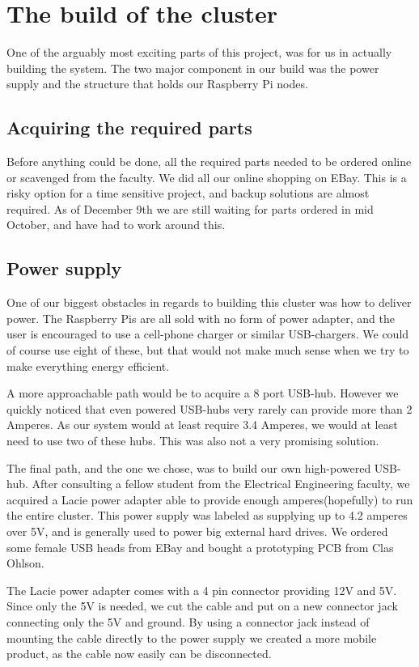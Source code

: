 \clearpage
\section{The build of the cluster}
\label{sec:build}
One of the arguably most exciting parts of this project, was for us in actually building the system. The two major component in our build was the power supply and the structure that holds our Raspberry Pi nodes. 

\subsection{Acquiring the required parts}
Before anything could be done, all the required parts needed to be ordered online or scavenged from the faculty. We did all our online shopping on EBay. This is a risky option for a time sensitive project, and backup solutions are almost required. As of December 9th we are still waiting for parts ordered in mid October, and have had to work around this.   

\subsection{Power supply}
One of our biggest obstacles in regards to building this cluster was how to deliver power. The Raspberry Pis are all sold with no form of power adapter, and the user is encouraged to use a cell-phone charger or similar USB-chargers. We could of course use eight of these, but that would not make much sense when we try to make everything energy efficient. 

A more approachable path would be to acquire a 8 port USB-hub. However we quickly noticed that even powered USB-hubs very rarely can provide more than 2 Amperes. As our system would at least require 3.4 Amperes, we would at least need to use two of these hubs. This was also not a very promising solution.

The final path, and the one we chose, was to build our own high-powered USB-hub. After consulting a fellow student from the Electrical Engineering faculty, we acquired a Lacie power adapter able to provide enough amperes(hopefully) to run the entire cluster. This power supply was labeled as supplying up to 4.2 amperes over 5V, and is generally used to power big external hard drives. We ordered some female USB heads from EBay and bought a prototyping PCB from Clas Ohlson.

The Lacie power adapter comes with a 4 pin connector providing 12V and 5V. Since only the 5V is needed, we cut the cable and put on a new connector jack connecting only the 5V and ground. By using a connector jack instead of mounting the cable directly to the power supply we created a more mobile product, as the cable now easily can be disconnected.

